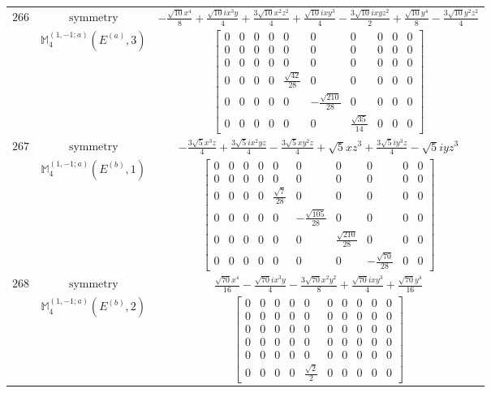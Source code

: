 \documentclass[fleqn,8pt,landscape]{jsarticle}
\begin{document}
\begin{longtable}{ccc}
$ 266 $ & $ \text{symmetry} $ & $ - \frac{\sqrt{10} x^{4}}{8} + \frac{\sqrt{10} i x^{3} y}{4} + \frac{3 \sqrt{10} x^{2} z^{2}}{4} + \frac{\sqrt{10} i x y^{3}}{4} - \frac{3 \sqrt{10} i x y z^{2}}{2} + \frac{\sqrt{10} y^{4}}{8} - \frac{3 \sqrt{10} y^{2} z^{2}}{4} $ \\
$  $ & $ \mathbb{M}_{4}^{(1,-1;a)}(E^{(a)},3) $ & $ \begin{bmatrix} 0 & 0 & 0 & 0 & 0 & 0 & 0 & 0 & 0 & 0 \\ 0 & 0 & 0 & 0 & 0 & 0 & 0 & 0 & 0 & 0 \\ 0 & 0 & 0 & 0 & 0 & 0 & 0 & 0 & 0 & 0 \\ 0 & 0 & 0 & 0 & \frac{\sqrt{42}}{28} & 0 & 0 & 0 & 0 & 0 \\ 0 & 0 & 0 & 0 & 0 & - \frac{\sqrt{210}}{28} & 0 & 0 & 0 & 0 \\ 0 & 0 & 0 & 0 & 0 & 0 & \frac{\sqrt{35}}{14} & 0 & 0 & 0 \end{bmatrix} $ \\ \hline
$ 267 $ & $ \text{symmetry} $ & $ - \frac{3 \sqrt{5} x^{3} z}{4} + \frac{3 \sqrt{5} i x^{2} y z}{4} - \frac{3 \sqrt{5} x y^{2} z}{4} + \sqrt{5} x z^{3} + \frac{3 \sqrt{5} i y^{3} z}{4} - \sqrt{5} i y z^{3} $ \\
$  $ & $ \mathbb{M}_{4}^{(1,-1;a)}(E^{(b)},1) $ & $ \begin{bmatrix} 0 & 0 & 0 & 0 & 0 & 0 & 0 & 0 & 0 & 0 \\ 0 & 0 & 0 & 0 & 0 & 0 & 0 & 0 & 0 & 0 \\ 0 & 0 & 0 & 0 & \frac{\sqrt{7}}{28} & 0 & 0 & 0 & 0 & 0 \\ 0 & 0 & 0 & 0 & 0 & - \frac{\sqrt{105}}{28} & 0 & 0 & 0 & 0 \\ 0 & 0 & 0 & 0 & 0 & 0 & \frac{\sqrt{210}}{28} & 0 & 0 & 0 \\ 0 & 0 & 0 & 0 & 0 & 0 & 0 & - \frac{\sqrt{70}}{28} & 0 & 0 \end{bmatrix} $ \\ \hline
$ 268 $ & $ \text{symmetry} $ & $ \frac{\sqrt{70} x^{4}}{16} - \frac{\sqrt{70} i x^{3} y}{4} - \frac{3 \sqrt{70} x^{2} y^{2}}{8} + \frac{\sqrt{70} i x y^{3}}{4} + \frac{\sqrt{70} y^{4}}{16} $ \\
$  $ & $ \mathbb{M}_{4}^{(1,-1;a)}(E^{(b)},2) $ & $ \begin{bmatrix} 0 & 0 & 0 & 0 & 0 & 0 & 0 & 0 & 0 & 0 \\ 0 & 0 & 0 & 0 & 0 & 0 & 0 & 0 & 0 & 0 \\ 0 & 0 & 0 & 0 & 0 & 0 & 0 & 0 & 0 & 0 \\ 0 & 0 & 0 & 0 & 0 & 0 & 0 & 0 & 0 & 0 \\ 0 & 0 & 0 & 0 & 0 & 0 & 0 & 0 & 0 & 0 \\ 0 & 0 & 0 & 0 & \frac{\sqrt{2}}{2} & 0 & 0 & 0 & 0 & 0 \end{bmatrix} $ \\ \hline

\end{longtable}
\end{document}

